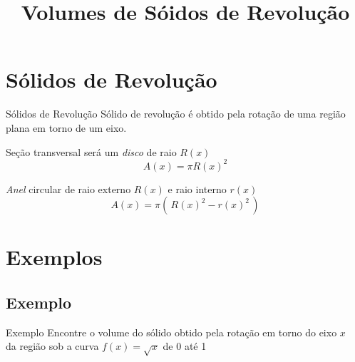 
\usepackage{integracao_e_series}

\title{Volumes de Sóidos de Revolução}



\addtitle

\section{Sólidos de Revolução}

\begin{frame}{Sólidos de Revolução}
  Sólido de revolução é obtido pela rotação de uma
  região plana em torno de um eixo.

  \pause
  \vspace{\baselineskip}
  Seção transversal será um \emph{disco} de raio $R(x)$
  \[
    A(x) = \pi R(x)^2
  \]

  \pause
  \vspace{0.5\baselineskip}
  \emph{Anel} circular de raio externo $R(x)$ e raio interno $r(x)$
  \[
    A(x) = \pi \left(\, R(x)^2 - r(x)^2 \,\right)
  \]
\end{frame}


\section{Exemplos}

\addtocounter{exemplo}{1}
\subsection{Exemplo \theexemplo}

\begin{frame}{Exemplo \theexemplo}
  Encontre o volume do sólido obtido pela rotação em torno do eixo $x$ \\
  da região sob a curva \(f(x) = \sqrt{x}\) de 0 até 1
\end{frame}

